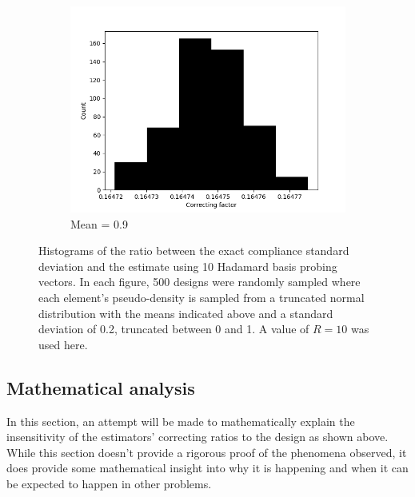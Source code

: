 \begin{figure}[!htbp]
\begin{subfigure}[t]{0.45\textwidth}
    \includegraphics[width=1\textwidth]{./images/robust_approx/correcting_factors_hadamard_std_10_09.png}
    \caption{Mean = 0.9}
  \end{subfigure}
  \caption{Histograms of the ratio between the exact compliance standard deviation and the estimate using 10 Hadamard basis probing vectors. In each figure, 500 designs were randomly sampled where each element's pseudo-density is sampled from a truncated normal distribution with the means indicated above and a standard deviation of 0.2, truncated between 0 and 1. A value of $R = 10$ was used here.}
  \label{fig:correcting_std}
\end{figure}

\subsection{Mathematical analysis} \label{sec:analysis}

In this section, an attempt will be made to mathematically explain the insensitivity of the estimators' correcting ratios to the design as shown above. While this section doesn't provide a rigorous proof of the phenomena observed, it does provide some mathematical insight into why it is happening and when it can be expected to happen in other problems.

